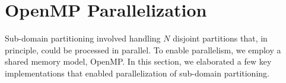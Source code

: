 \documentclass{article}
\begin{document}




\section{OpenMP Parallelization}
\label{sec: parallelization}
Sub-domain partitioning involved handling $N$ disjoint partitions that, in principle, could be processed in parallel. To enable parallelism, 
we employ a shared memory model, OpenMP. In this section, we elaborated a few key implementations that enabled parallelization of sub-domain partitioning. 
\end{document}
